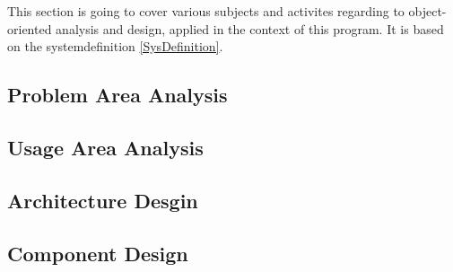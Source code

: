 This section is going to cover various subjects and activites regarding to object-oriented analysis and design, applied in the context of this program. It is based on the systemdefinition \ref{SysDefinition}.

\subsection{Problem Area Analysis}
\label{ProblemArea}

\subsection{Usage Area Analysis}
\label{UsageArea}

\subsection{Architecture Desgin}
\label{ArchDes}

\subsection{Component Design}
\label{ComponentDesign}
